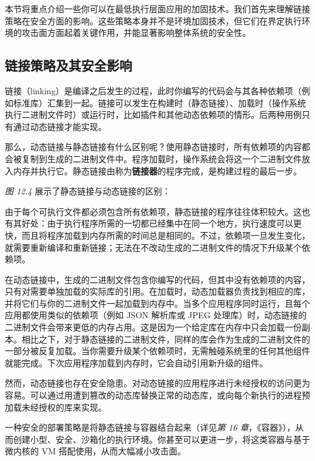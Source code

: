 本节将重点介绍一些你可以在最低执行层面应用的加固技术。我们首先来理解链接策略在安全方面的影响。这些策略本身并不是环境加固技术，但它们在界定执行环境的攻击面方面起着关键作用，并能显著影响整体系统的安全性。

\subsection{链接策略及其安全影响}

\label{idx:1145}
\label{idx:1146}
链接（linking）是编译之后发生的过程，此时你编写的代码会与其各种依赖项（例如标准库）汇集到一起。链接可以发生在构建时（静态链接）、加载时（操作系统执行二进制文件时）或运行时，比如插件和其他动态依赖项的情形。后两种用例只有通过动态链接才能实现。

\label{idx:1147}
那么，动态链接与静态链接有什么区别呢？使用静态链接时，所有依赖项的内容都会被复制到生成的二进制文件中。程序加载时，操作系统会将这一个二进制文件放入内存并执行它。静态链接由称为\textbf{链接器}的程序完成，是构建过程的最后一步。

\emph{图 12.4} 展示了静态链接与动态链接的区别：


\label{idx:1148}
\label{idx:1149}
由于每个可执行文件都必须包含所有依赖项，静态链接的程序往往体积较大。这也有其好处：由于执行程序所需的一切都已经集中在同一个地方，执行速度可以更快，而且将程序加载到内存所需的时间总是相同的。不过，依赖项一旦发生变化，就需要重新编译和重新链接；无法在不改动生成的二进制文件的情况下升级某个依赖项。

在动态链接中，生成的二进制文件包含你编写的代码，但其中没有依赖项的内容，只有对需要单独加载的实际库的引用。在加载时，动态加载器负责找到相应的库，并将它们与你的二进制文件一起加载到内存中。当多个应用程序同时运行，且每个应用都使用类似的依赖项（例如 JSON 解析库或 JPEG 处理库）时，动态链接的二进制文件会带来更低的内存占用。这是因为一个给定库在内存中只会加载一份副本。相比之下，对于静态链接的二进制文件，同样的库会作为生成的二进制文件的一部分被反复加载。当你需要升级某个依赖项时，无需触碰系统里的任何其他组件就能完成。下次应用程序加载到内存时，它会自动引用新升级的组件。

\label{idx:1150}
然而，动态链接也存在安全隐患。对动态链接的应用程序进行未经授权的访问更为容易。可以通过用遭到篡改的动态库替换正常的动态库，或向每个新执行的进程预加载未经授权的库来实现。

\label{idx:1151}
一种安全的部署策略是将静态链接与容器结合起来（详见\emph{第 16 章}，《容器》），从而创建小型、安全、沙箱化的执行环境。你甚至可以更进一步，将这类容器与基于微内核的 VM 搭配使用，从而大幅减小攻击面。

